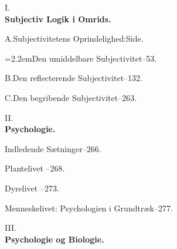 \documentclass[11pt]{book}
\begin{document}
{\setlength{\parindent}{0pt}

\begin{center}I.\\ {\bfseries Subjectiv Logik i Omrids.}\end{center}

A.\quad Subjectivitetens Oprindelighed:\hfill{\small Side.}\par\smallskip
\hangindent=2.2em\hspace*{1.1em}Den umiddelbare Subjectivitet--53.\par\smallskip
B.\quad Den reflecterende Subjectivitet--132.\par\smallskip
C.\quad Den begribende Subjectivitet--263.\par\medskip

\begin{center}II.\\ {\bfseries Psychologie.}\end{center}

Indledende Sætninger--266.\par\smallskip
Plantelivet --268.\par\smallskip
Dyrelivet --273.\par\smallskip
Menneskelivet: Psychologien i Grundtræk--277.\par\medskip

\begin{center}III.\\ {\bfseries Psychologie og Biologie.}\end{center}

}
\end{document}
